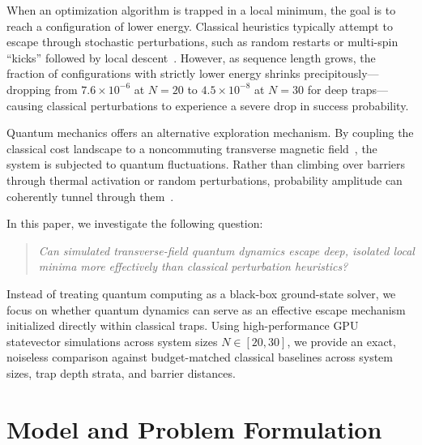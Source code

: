 \documentclass[10pt,twocolumn,a4paper]{article}
\begin{document}
When an optimization algorithm is trapped in a local minimum, the goal is to reach a configuration of lower energy. Classical heuristics typically attempt to escape through stochastic perturbations, such as random restarts or multi-spin ``kicks'' followed by local descent~\cite{marti2003}. However, as sequence length grows, the fraction of configurations with strictly lower energy shrinks precipitously---dropping from $7.6 \times 10^{-6}$ at $N = 20$ to $4.5 \times 10^{-8}$ at $N = 30$ for deep traps---causing classical perturbations to experience a severe drop in success probability.

Quantum mechanics offers an alternative exploration mechanism. By coupling the classical cost landscape to a noncommuting transverse magnetic field~\cite{kadowaki1998}, the system is subjected to quantum fluctuations. Rather than climbing over barriers through thermal activation or random perturbations, probability amplitude can coherently tunnel through them~\cite{farhi2001, santoro2002, denchev2016}.

In this paper, we investigate the following question:
\begin{quote}
    \textit{Can simulated transverse-field quantum dynamics escape deep, isolated local minima more effectively than classical perturbation heuristics?}
\end{quote}
Instead of treating quantum computing as a black-box ground-state solver, we focus on whether quantum dynamics can serve as an effective escape mechanism initialized directly within classical traps. Using high-performance GPU statevector simulations across system sizes $N \in [20, 30]$, we provide an exact, noiseless comparison against budget-matched classical baselines across system sizes, trap depth strata, and barrier distances.

\section{Model and Problem Formulation}
\label{sec:model}
\end{document}

